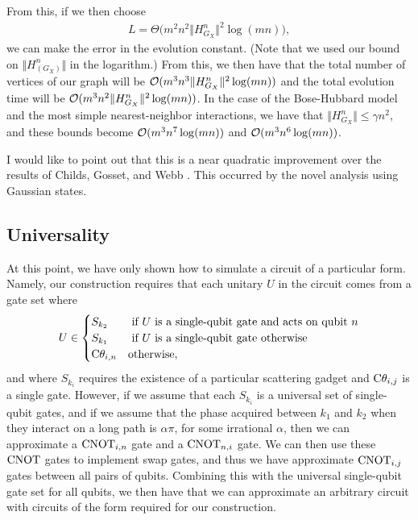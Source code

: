 \documentclass[../thesis-main/thesis-main]{subfiles}
\begin{document}
From this, if we then choose 
\begin{align}
  L = \Theta\Big( m^2 n^2 \Vert H_{G_X}^n \Vert^2 \log(m n)\Big),
\end{align}
we can make the error in the evolution constant. (Note that we used our bound on $\Vert H_(G_X)^n\Vert$ in the logarithm.)  From this, we then have that the total number of vertices of our graph will be $\mathcal{O}(m^3 n^3 \Vert H_{G_X}^n \Vert^2 \log(m n))$ and the total evolution time will be $\mathcal{O}(m^3 n^2 \Vert H_{G_X}^n \Vert^2 \log(m n))$.  In the case of the Bose-Hubbard model and the most simple nearest-neighbor interactions, we have that $\Vert H_{G_X}^n\Vert \leq \gamma n^2$, and these bounds become $\mathcal{O}( m^3 n^7 \log(mn))$ and $\mathcal{O}(m^3 n^6 \log(mn))$.

I would like to point out that this is a near quadratic improvement over the results of Childs, Gosset, and Webb \cite{MPQW}.  This occurred by the novel analysis using Gaussian states.

\subsection{Universality}

At this point, we have only shown how to simulate a circuit of a particular form.  Namely, our construction requires that each unitary $U$ in the circuit comes from a gate set where 
\begin{align}
  U \in \begin{cases}
    S_{k_2} & \text{ if $U$ is a single-qubit gate and acts on qubit $n$}\\
    S_{k_1} & \text{ if $U$ is a single-qubit gate otherwise}\\
    \mathrm{C}\theta_{i,n} & \text{otherwise},
  \end{cases}
\end{align}
and where $S_{k_i}$ requires the existence of a particular scattering gadget and $\mathrm{C}\theta_{i,j}$ is a single gate.  However, if we assume that each $S_{k_i}$ is a universal set of single-qubit gates, and if we assume that the phase acquired between $k_1$ and $k_2$ when they interact on a long path is $\alpha \pi$, for some irrational $\alpha$, then we can approximate a $\mathrm{CNOT}_{i,n}$ gate and a $\mathrm{CNOT}_{n,i}$ gate.  We can then use these $\mathrm{CNOT}$ gates to implement swap gates, and thus we have approximate $\mathrm{CNOT}_{i,j}$ gates between all pairs of qubits.  Combining this with the universal single-qubit gate set for all qubits, we then have that we can approximate an arbitrary circuit with circuits of the form required for our construction.
\end{document}
